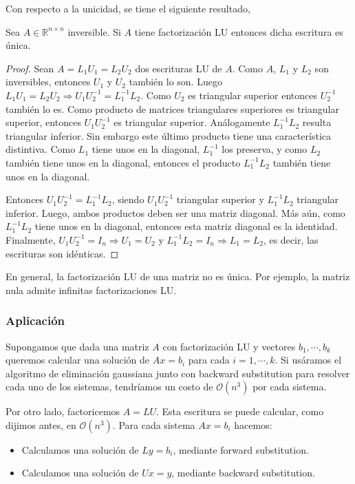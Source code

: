 Con respecto a la unicidad, se tiene el siguiente resultado,

\begin{propo}
Sea $A \in \mathbb{R}^{n \times n}$ inversible. Si $A$ tiene factorización LU entonces dicha escritura es única.

\begin{proof}
Sean $A = L_1 U_1 = L_2 U_2$ dos escrituras LU de $A$. Como $A$, $L_1$ y $L_2$ son inversibles, entonces $U_1$ y $U_2$ también lo son. Luego $L_1 U_1 = L_2 U_2 \Rightarrow U_1 U_2^{-1} = L_1^{-1} L_2$. Como $U_2$ es triangular superior entonces $U_2^{-1}$ también lo es. Como producto de matrices triangulares superiores es triangular superior, entonces $U_1 U_2^{-1}$ es triangular superior. Análogamente $L_1^{-1} L_2$ resulta triangular inferior. Sin embargo este último producto tiene una característica distintiva. Como $L_1$ tiene unos en la diagonal, $L_1^{-1}$ los preserva, y como $L_2$ también tiene unos en la diagonal, entonces el producto $L_1^{-1} L_2$ también tiene unos en la diagonal.

Entonces $U_1 U_2^{-1} = L_1^{-1} L_2$, siendo $U_1 U_2^{-1}$ triangular superior y $L_1^{-1} L_2$ triangular inferior. Luego, ambos productos deben ser una matriz diagonal. Más aún, como $L_1^{-1} L_2$ tiene unos en la diagonal, entonces esta matriz diagonal es la identidad. Finalmente, $U_1 U_2^{-1} = I_n \Rightarrow U_1 = U_2$ y $L_1^{-1}L_2 = I_n \Rightarrow L_1 = L_2$, es decir, las escrituras son idénticas.

\end{proof}
\end{propo}

\begin{obs}
En general, la factorización LU de una matriz no es única. Por ejemplo, la matriz nula admite infinitas factorizaciones LU.
\end{obs}

\subsubsection{Aplicación}
Supongamos que dada una matriz $A$ con factorización LU y vectores $b_1, \cdots, b_k$ queremos calcular una solución de $Ax = b_i$ para cada $i = 1, \cdots, k$. Si usáramos el algoritmo de eliminación gaussiana junto con backward substitution para resolver cada uno de los sistemas, tendríamos un costo de $\mathcal{O}(n^3)$ por cada sistema.

Por otro lado, factoricemos $A = LU$. Esta escritura se puede calcular, como dijimos antes, en $\mathcal{O}(n^3)$. Para cada sistema $Ax = b_i$ hacemos:
\begin{itemize}
\item Calculamos una solución de $Ly = b_i$, mediante forward substitution.
\item Calculamos una solución de $Ux = y$, mediante backward substitution.
\end{itemize}

